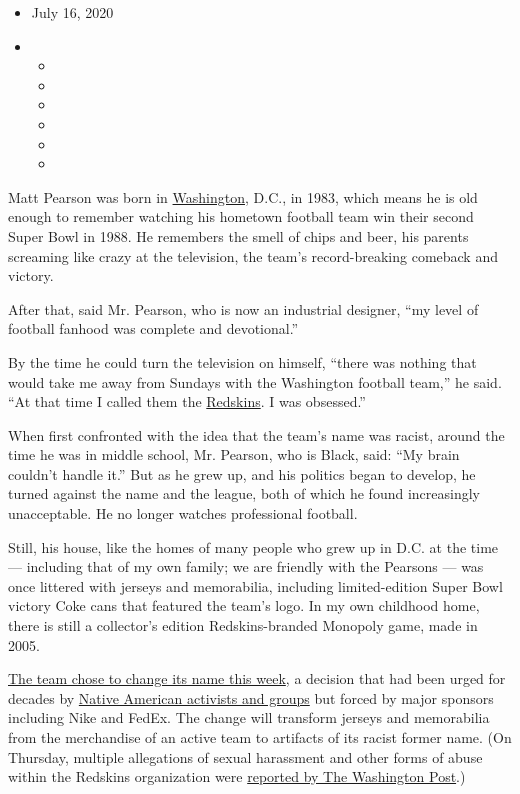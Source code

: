 \begin{itemize}
\item
  July 16, 2020
\item
  \begin{itemize}
  \item
  \item
  \item
  \item
  \item
  \item
  \end{itemize}
\end{itemize}

Matt Pearson was born in
\href{https://www.nytimes3xbfgragh.onion/2020/07/16/sports/football/washington-sexual-assault-harassment-dan-snyder.html}{Washington},
D.C., in 1983, which means he is old enough to remember watching his
hometown football team win their second Super Bowl in 1988. He remembers
the smell of chips and beer, his parents screaming like crazy at the
television, the team's record-breaking comeback and victory.

After that, said Mr. Pearson, who is now an industrial designer, ``my
level of football fanhood was complete and devotional.''

By the time he could turn the television on himself, ``there was nothing
that would take me away from Sundays with the Washington football
team,'' he said. ``At that time I called them the
\href{https://www.nytimes3xbfgragh.onion/2020/07/16/sports/football/washington-sexual-assault-harassment-dan-snyder.html}{Redskins}.
I was obsessed.''

When first confronted with the idea that the team's name was racist,
around the time he was in middle school, Mr. Pearson, who is Black,
said: ``My brain couldn't handle it.'' But as he grew up, and his
politics began to develop, he turned against the name and the league,
both of which he found increasingly unacceptable. He no longer watches
professional football.

Still, his house, like the homes of many people who grew up in D.C. at
the time --- including that of my own family; we are friendly with the
Pearsons --- was once littered with jerseys and memorabilia, including
limited-edition Super Bowl victory Coke cans that featured the team's
logo. In my own childhood home, there is still a collector's edition
Redskins-branded Monopoly game, made in 2005.

\href{https://www.nytimes3xbfgragh.onion/2020/07/13/sports/football/washington-redskins-new-name.html}{The
team chose to change its name this week}, a decision that had been urged
for decades by
\href{https://www.washingtonpost.com/sports/2020/07/07/redskins-conduct-name-review-native-american-groups-say-they-havent-heard-team/}{Native
American activists and groups} but forced by major sponsors including
Nike and FedEx. The change will transform jerseys and memorabilia from
the merchandise of an active team to artifacts of its racist former
name. (On Thursday, multiple allegations of sexual harassment and other
forms of abuse within the Redskins organization were
\href{https://www.washingtonpost.com/sports/2020/07/16/redskins-sexual-harassment-larry-michael-alex-santos/?arc404=true}{reported
by The Washington Post}.)

